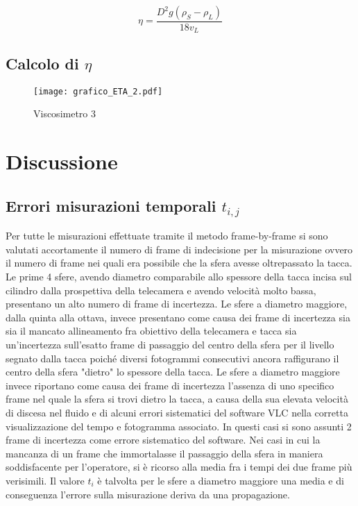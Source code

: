 \documentclass[a4paper,11pt,oneside]{article}
\begin{document}
\begin{equation}
\eta= \frac{{D}^2g\left(\rho_S - \rho_L\right)}{18 v_{L} } 
\end{equation}


\subsection{Calcolo di $\eta$}


\begin{figure}[h!]
    \centering
    \caption{Viscosimetro 3}
        \texttt{[image: grafico\_ETA\_2.pdf]}
    
        \label{fig:vel3}
        
\end{figure} 



\section{Discussione}
\subsection{Errori misurazioni temporali $t_{i,j}$}
Per tutte le misurazioni effettuate tramite il metodo frame-by-frame si sono valutati accortamente il numero di frame di indecisione per la misurazione ovvero il numero di frame nei quali era possibile che la sfera avesse oltrepassato la tacca.
Le prime 4 sfere, avendo diametro comparabile allo spessore della tacca incisa sul cilindro dalla prospettiva della telecamera e avendo velocità molto bassa, presentano un alto numero di frame di incertezza.
Le sfere a diametro maggiore, dalla quinta alla ottava, invece presentano come causa dei frame di incertezza sia sia il mancato allineamento fra obiettivo della telecamera e tacca sia un'incertezza sull'esatto frame di passaggio del centro della sfera per il livello segnato dalla tacca poiché diversi fotogrammi consecutivi ancora raffigurano il centro della sfera "dietro" lo spessore della tacca.
Le sfere a diametro maggiore invece riportano come causa dei frame di incertezza l'assenza di uno specifico frame nel quale la sfera si trovi dietro la tacca, a causa della sua elevata velocità di discesa nel fluido e di alcuni errori sistematici del software VLC nella corretta visualizzazione del tempo e fotogramma associato. In questi casi si sono assunti 2 frame di incertezza come errore sistematico del software. Nei casi in cui la mancanza di un frame che immortalasse il passaggio della sfera in maniera soddisfacente per l'operatore, si è ricorso alla media fra i tempi dei due frame più verisimili. Il valore $t_i$ è talvolta per le sfere a diametro maggiore una media e di conseguenza l'errore sulla misurazione deriva da una propagazione. 
\end{document}
